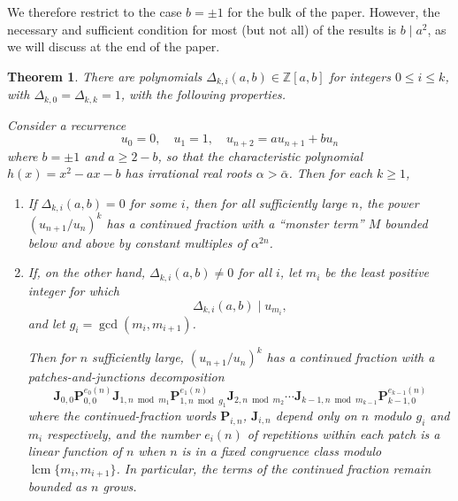 \documentclass{article}
\numberwithin{equation}{section}
\newtheorem{thm}{Theorem}[section]
\theoremstyle{definition}
\theoremstyle{remark}
\DeclareMathOperator{\lcm}{lcm}
\newcommand{\ZZ}{\mathbb{Z}}
\newcommand{\<}{\left\langle}
\renewcommand{\>}{\right\rangle}
\begin{document}
We therefore restrict to the case $b = \pm 1$ for the bulk of the paper. However, the necessary and sufficient condition for most (but not all) of the results is $b \mid a^2$, as we will discuss at the end of the paper.

\begin{thm}\label{thm:main_intro}
  There are polynomials $\Delta_{k,i}(a,b) \in \ZZ[a,b]$ for integers $0 \leq i \leq k$, with $\Delta_{k,0} = \Delta_{k,k} = 1$, with the following properties.

  Consider a recurrence
  \begin{equation*}
    u_0 = 0, \quad u_1 = 1, \quad u_{n+2} = a u_{n+1} + b u_n
  \end{equation*}
  where $b = \pm 1$ and $a \geq 2 - b$, so that the characteristic polynomial $h(x) = x^2 - a x - b$ has irrational real roots $\alpha > \bar\alpha$. Then for each $k \geq 1$,
  \begin{enumerate}[label=\textup{(\alph*)}]
    \item\label{main:monster} If $\Delta_{k,i}(a,b) = 0$ for some $i$, then for all sufficiently large $n$, the power $(u_{n+1}/u_n)^k$ has a continued fraction with a ``monster term\kern-1pt'' $M$ bounded below and above by constant multiples of $\alpha^{2n}$.
    \item\label{main:JPJ} If, on the other hand, $\Delta_{k,i}(a,b) \neq 0$ for all $i$, let $m_i$ be the least positive integer for which
    \begin{equation*}
      \Delta_{k,i}(a,b) \mid u_{m_i},
    \end{equation*}
    and let $g_i = \gcd(m_i, m_{i+1})$.

    Then for $n$ sufficiently large, $(u_{n+1}/u_n)^k$ has a continued fraction with a patches-and-junctions decomposition
    \begin{equation}
      \mathbf{J}_{0,0} \mathbf{P}_{0,0}^{e_0(n)} \mathbf{J}_{1, n \bmod m_1} \mathbf{P}_{1, n \bmod g_1}^{e_1(n)} \mathbf{J}_{2, n \bmod m_2} \cdots \mathbf{J}_{k-1, n \bmod m_{k-1}} \mathbf{P}_{k-1, 0}^{e_{k-1}(n)}
    \end{equation}
    where the continued-fraction words $\mathbf{P}_{i,n}$, $\mathbf{J}_{i,n}$ depend only on $n$ modulo $g_i$ and $m_i$ respectively, and the number $e_i(n)$ of repetitions within each patch is a linear function of $n$ when $n$ is in a fixed congruence class modulo $\lcm\{m_i, m_{i+1}\}$. In particular, the terms of the continued fraction remain bounded as $n$ grows.
  \end{enumerate}
\end{thm}
\end{document}
